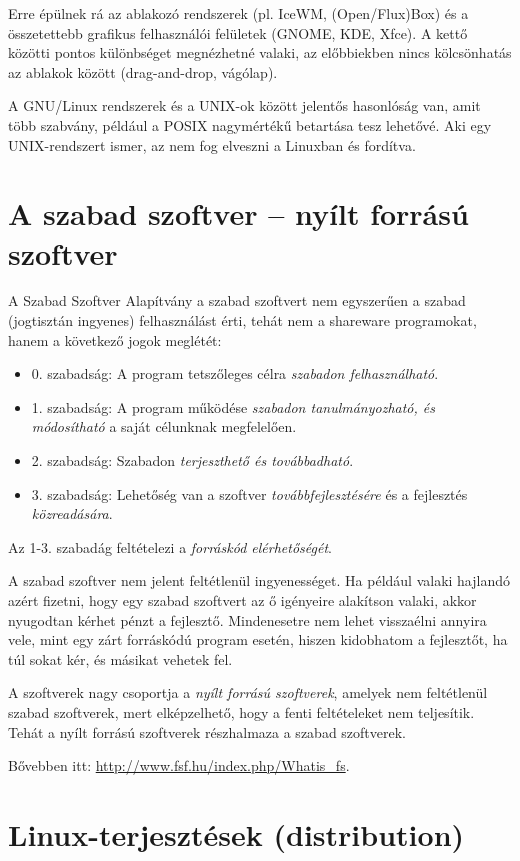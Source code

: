 \documentclass[a4paper]{article}
\begin{document}
Erre épülnek rá az ablakozó rendszerek (pl. IceWM, (Open/Flux)Box) és a
összetettebb grafikus felhasználói felületek (GNOME, KDE, Xfce). 
{\small A kettő közötti pontos különbséget megnézhetné valaki, az
előbbiekben nincs kölcsönhatás az ablakok között (drag-and-drop,
vágólap).}

A GNU/Linux rendszerek és a UNIX-ok között jelentős hasonlóság van, amit
több szabvány, például a POSIX nagymértékű betartása tesz lehetővé. Aki
egy UNIX-rendszert ismer, az nem fog elveszni a Linuxban és fordítva.

\section{A szabad szoftver -- nyílt forrású szoftver}

A Szabad Szoftver Alapítvány a szabad szoftvert nem egyszerűen a szabad
(jogtisztán ingyenes) felhasználást érti, tehát nem a shareware
programokat, hanem a következő jogok meglétét:
\begin{itemize}
\item 0. szabadság: A program tetszőleges célra \emph{szabadon
felhasználható}.
\item 1. szabadság: A program működése \emph{szabadon tanulmányozható,
és módosítható} a saját célunknak megfelelően.
\item 2. szabadság: Szabadon \emph{terjeszthető és továbbadható}.
\item 3. szabadság: Lehetőség van a szoftver \emph{továbbfejlesztésére} és a
fejlesztés \emph{közreadására}.
\end{itemize}

Az 1-3. szabadág feltételezi a \emph{forráskód elérhetőségét}.

A szabad szoftver nem jelent feltétlenül ingyenességet. Ha például
valaki hajlandó azért fizetni, hogy egy szabad szoftvert az ő igényeire
alakítson valaki, akkor nyugodtan kérhet pénzt a fejlesztő.
Mindenesetre nem lehet visszaélni annyira vele, mint egy zárt forráskódú
program esetén, hiszen kidobhatom a fejlesztőt, ha túl sokat kér, és
másikat vehetek fel.

A szoftverek nagy csoportja a \emph{nyílt forrású szoftverek}, amelyek
nem feltétlenül szabad szoftverek, mert elképzelhető, hogy a fenti
feltételeket nem teljesítik. Tehát a nyílt forrású szoftverek
részhalmaza a szabad szoftverek.

Bővebben itt: \url{http://www.fsf.hu/index.php/Whatis_fs}.

\section{Linux-terjesztések (distribution)}
\end{document}

